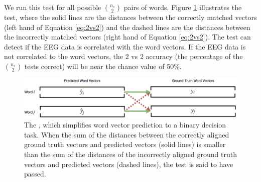 \noindent We run this test for all possible ${\binom{n_s}{2}}$ pairs of words. Figure \ref{fig:2vs2} illustrates the \tvt test, where the solid lines are the distances between the correctly matched vectors (left hand of Equation \ref{eq:2vs2}) and the dashed lines are the distances between the incorrectly matched vectors (right hand of Equation \ref{eq:2vs2}). The \tvt test can detect if the EEG data is correlated with the word vectors. If the EEG data is not correlated to the word vectors, the 2 vs 2 accuracy (the percentage of the ${\binom{n_s}{2}}$ \tvt tests correct) will be  near the chance value of 50\%.

\begin{figure}[t]
  \centering
  \includegraphics[width=\linewidth]{figures/2vs2}
  \caption{The \tvt, which simplifies word vector prediction to a binary decision task.  
 When the sum of the distances between the correctly aligned ground truth vectors and predicted vectors (solid lines) is smaller than the sum of the distances of the incorrectly aligned ground truth vectors and predicted vectors (dashed lines), the \tvt test is said to have passed.}
  \label{fig:2vs2}
\end{figure}
